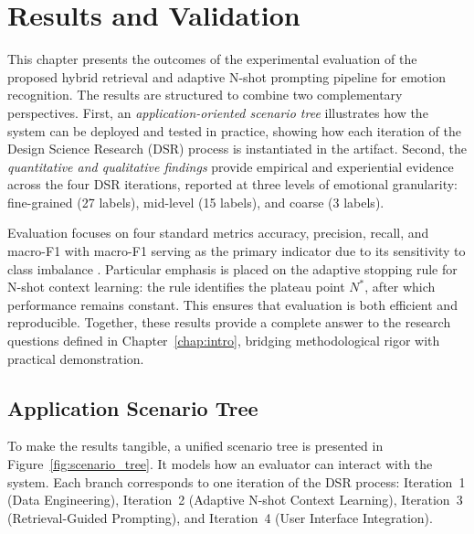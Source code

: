 \chapter{Results and Validation}
\label{chap:results}

This chapter presents the outcomes of the experimental evaluation of the proposed hybrid retrieval and adaptive N-shot prompting pipeline for emotion recognition. The results are structured to combine two complementary perspectives. First, an \textit{application-oriented scenario tree} illustrates how the system can be deployed and tested in practice, showing how each iteration of the Design Science Research (DSR) process is instantiated in the artifact. Second, the \textit{quantitative and qualitative findings} provide empirical and experiential evidence across the four DSR iterations, reported at three levels of emotional granularity: fine-grained (27 labels), mid-level (15 labels), and coarse (3 labels).  

Evaluation focuses on four standard metrics accuracy, precision, recall, and macro-F1 with macro-F1 serving as the primary indicator due to its sensitivity to class imbalance \cite{demszky2020goemotions}. Particular emphasis is placed on the adaptive stopping rule for N-shot context learning: the rule identifies the plateau point $N^{\ast}$, after which performance remains constant. This ensures that evaluation is both efficient and reproducible. Together, these results provide a complete answer to the research questions defined in Chapter~\ref{chap:intro}, bridging methodological rigor with practical demonstration.

\section{Application Scenario Tree}
To make the results tangible, a unified scenario tree is presented in Figure~\ref{fig:scenario_tree}. It models how an evaluator can interact with the system. Each branch corresponds to one iteration of the DSR process: Iteration~1 (Data Engineering), Iteration~2 (Adaptive N-shot Context Learning), Iteration~3 (Retrieval-Guided Prompting), and Iteration~4 (User Interface Integration).  

